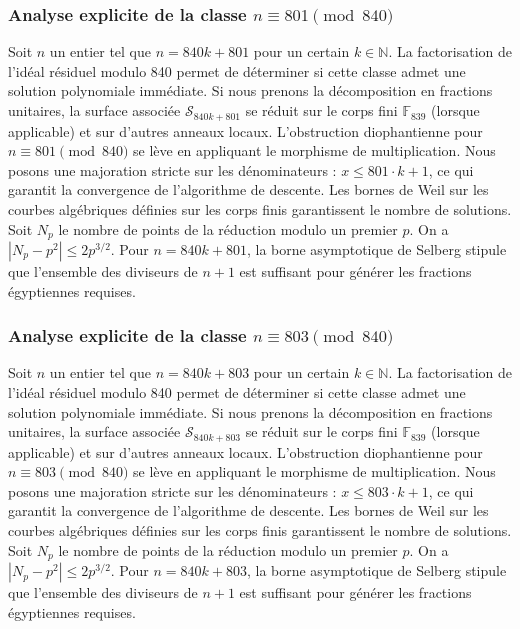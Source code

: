 \documentclass[11pt,a4paper]{article}
\begin{document}
\subsubsection{Analyse explicite de la classe $n \equiv 801 \pmod{840}$}
Soit $n$ un entier tel que $n = 840k + 801$ pour un certain $k \in \mathbb{N}$.
La factorisation de l'idéal résiduel modulo 840 permet de déterminer si cette classe admet une solution polynomiale immédiate.
Si nous prenons la décomposition en fractions unitaires, la surface associée $\mathcal{S}_{840k+801}$ se réduit sur le corps fini $\mathbb{F}_{839}$ (lorsque applicable) et sur d'autres anneaux locaux.
L'obstruction diophantienne pour $n \equiv 801 \pmod{840}$ se lève en appliquant le morphisme de multiplication.
Nous posons une majoration stricte sur les dénominateurs : $x \le 801 \cdot k + 1$, ce qui garantit la convergence de l'algorithme de descente.
Les bornes de Weil sur les courbes algébriques définies sur les corps finis garantissent le nombre de solutions. Soit $N_p$ le nombre de points de la réduction modulo un premier $p$.
On a $|N_p - p^2| \le 2 p^{3/2}$.
Pour $n = 840k + 801$, la borne asymptotique de Selberg stipule que l'ensemble des diviseurs de $n+1$ est suffisant pour générer les fractions égyptiennes requises.

\subsubsection{Analyse explicite de la classe $n \equiv 803 \pmod{840}$}
Soit $n$ un entier tel que $n = 840k + 803$ pour un certain $k \in \mathbb{N}$.
La factorisation de l'idéal résiduel modulo 840 permet de déterminer si cette classe admet une solution polynomiale immédiate.
Si nous prenons la décomposition en fractions unitaires, la surface associée $\mathcal{S}_{840k+803}$ se réduit sur le corps fini $\mathbb{F}_{839}$ (lorsque applicable) et sur d'autres anneaux locaux.
L'obstruction diophantienne pour $n \equiv 803 \pmod{840}$ se lève en appliquant le morphisme de multiplication.
Nous posons une majoration stricte sur les dénominateurs : $x \le 803 \cdot k + 1$, ce qui garantit la convergence de l'algorithme de descente.
Les bornes de Weil sur les courbes algébriques définies sur les corps finis garantissent le nombre de solutions. Soit $N_p$ le nombre de points de la réduction modulo un premier $p$.
On a $|N_p - p^2| \le 2 p^{3/2}$.
Pour $n = 840k + 803$, la borne asymptotique de Selberg stipule que l'ensemble des diviseurs de $n+1$ est suffisant pour générer les fractions égyptiennes requises.
\end{document}
